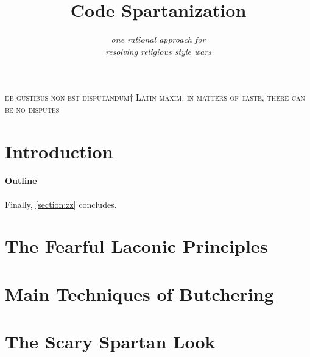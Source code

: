 \documentclass[preprint,10pt,nonatbib]{sigplanconf}
\title{Code Spartanization}
\subtitle{\scriptsize \emph{one rational approach for \\ resolving  religious style wars}}
\begin{document}
\textsc{de gustibus non est disputandum†{%
    Latin maxim: in matters of taste, there can be no disputes
}}
{\let\newpage\relax\maketitle}
\begin{flushright}
  \begin{minipage}{2.5in}
    \normalsize \rmfamily\scshape
    \color{red}{%
      suum cuique \newline
      Tu mortale, essere avvertiti. \newline
      Tu non Shallt Rimuovere \newline
      Questo comandamento \newline
      Mentre ci sono segni di Haste \newline
      in questo documento !!!! \newline
    }
  \end{minipage}
\end{flushright}

\begin{abstract}
  
\end{abstract}
\section{Introduction}


\paragraph{Outline}
\label{section:principia}
\label{section:techniques}
\label{section:look}
\label{section:jack}
\label{section:look}
\label{section:initial}
\label{section:zz}
Finally, \cref{section:zz} concludes.

\section{The Fearful Laconic Principles}
\label{section:principia}


\section{Main Techniques of Butchering}
\label{section:techniques}


\section{The Scary Spartan Look}
\label{section:look}

\end{document}

